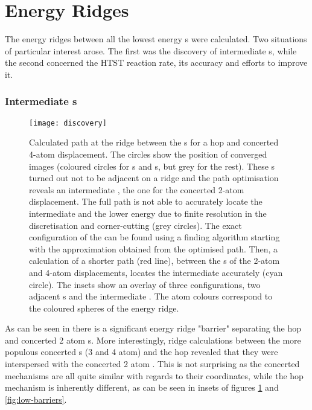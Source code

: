 \section{Energy Ridges}
\label{al-energy-ridges}
The energy ridges between all the lowest energy s were calculated.
Two situations of particular interest arose.
The first was the discovery of intermediate s, while the second concerned the HTST reaction rate, its accuracy and efforts to improve it.

\subsubsection{Intermediate s}
\begin{figure}[hp]
\begin{center}
\texttt{[image: discovery]}
    \parbox{0.85\linewidth}{
\caption{
Calculated path at the ridge between the s for a hop and concerted 4-atom displacement.
The circles show the position of converged images (coloured circles for s and s, but grey for the rest). 
These s turned out not to be adjacent on a ridge and the path optimisation reveals an intermediate , the one for the concerted 2-atom displacement.
The full path is not able to accurately locate the intermediate  and the lower energy  due to finite resolution in the discretisation and corner-cutting (grey circles).
The exact configuration of the  can be found using a  finding algorithm starting with the approximation obtained from the optimised path.
Then, a calculation of a shorter path (red line), between the s of the 2-atom and 4-atom displacements, locates the intermediate  accurately (cyan circle).
The insets show an overlay of three configurations, two adjacent s and the intermediate .
The atom colours correspond to the coloured spheres of the energy ridge.
}
\label{fig:discovery}
}
\end{center}
\end{figure}

As can be seen in  there is a significant energy ridge "barrier" separating the hop and concerted 2 atom s.
More interestingly, ridge calculations between the more populous concerted s (3 and 4 atom) and the hop revealed that they were interspersed with the concerted 2 atom .
This is not surprising as the concerted mechanisms are all quite similar with regards to their coordinates, while the hop mechanism is inherently different, as can be seen in insets of figures \ref{fig:discovery} and \ref{fig:low-barriers}.

